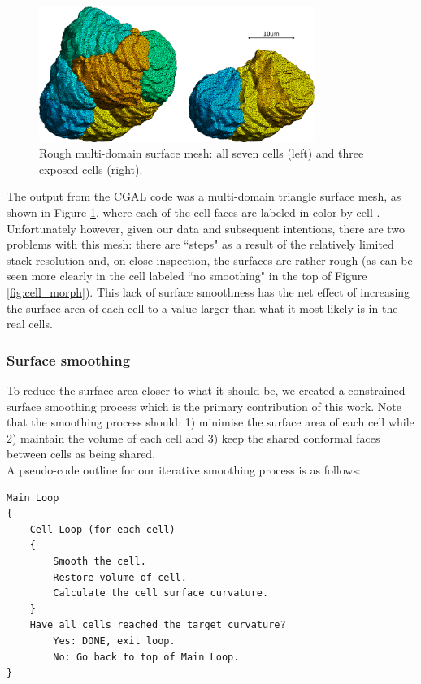 \documentclass[a4paper,10pt]{article}
\begin{document}
\begin{figure}[H]
\begin{center}
\includegraphics[width=0.8\textwidth]{images/rough.pdf}
\end{center}
\caption{Rough multi-domain surface mesh: all seven cells (left) and three exposed cells (right).}
\label{fig:rough}
\end{figure}

The output from the CGAL code was a multi-domain triangle surface mesh, as shown in Figure \ref{fig:rough}, where each of the cell faces are labeled in color by cell . Unfortunately however, given our data and subsequent intentions, there are two problems with this mesh: there are ``steps" as a result of the relatively limited stack resolution and, on close inspection, the surfaces are rather rough (as can be seen more clearly in the cell labeled ``no smoothing" in the top of Figure \ref{fig:cell_morph}). This lack of surface smoothness has the net effect of increasing the surface area of each cell to a value larger than what it most likely is in the real cells.\\

\subsubsection{Surface smoothing}

To reduce the surface area closer to what it should be, we created a constrained surface smoothing process which is the primary contribution of this work. Note that the smoothing process should: 1) minimise the surface area of each cell while 2) maintain the volume of each cell and 3) keep the shared conformal faces between cells as being shared.\\

A pseudo-code outline for our iterative smoothing process is as follows:
\begin{verbatim}
Main Loop
{
    Cell Loop (for each cell)
    {
        Smooth the cell.
        Restore volume of cell.
        Calculate the cell surface curvature.
    }
    Have all cells reached the target curvature?
        Yes: DONE, exit loop.
        No: Go back to top of Main Loop.  
}
\end{verbatim}
\end{document}
